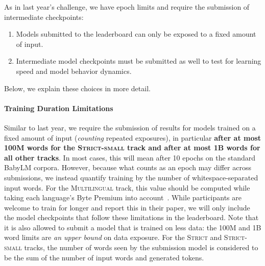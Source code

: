 \documentclass[11pt]{article}
\newcommand{\strict}[1]{\textsc{Strict}}
\newcommand{\strictsmall}[1]{\textsc{Strict-small}}
\newcommand{\multilingual}[1]{\textsc{Multilingual}}
\begin{document}



As in last year's challenge, we have epoch limits and require the submission of intermediate checkpoints:
\begin{enumerate}
    \item Models submitted to the leaderboard can only be exposed to a fixed amount of input.
    \item Intermediate model checkpoints must be submitted as well to test for learning speed and model behavior dynamics.
\end{enumerate}
Below, we explain these choices in more detail.

\paragraph{Training Duration Limitations}
Similar to last year, we require the submission of results for models trained on a fixed amount of input (\emph{counting} repeated exposures), in particular \textbf{after at most 100M words for the \strictsmall{} track and after at most 1B words for all other tracks}.
In most cases, this will mean after 10 epochs on the standard BabyLM corpora.
However, because what counts as an epoch may differ across submissions, we instead quantify training by the number of whitespace-separated input words. For the \multilingual{} track, this value should be computed while taking each language's Byte Premium into account~\citep{arnett-etal-2024-bit}.
While participants are welcome to train for longer and report this in their paper, we will only include the model checkpoints that follow these limitations in the leaderboard.
Note that it is also allowed to submit a model that is trained on less data: the 100M and 1B word limits are \textit{an upper bound} on data exposure. For the \strict{} and \strictsmall{} tracks, the number of words seen by the submission model is considered to be the sum of the number of input words and generated tokens.
\end{document}
